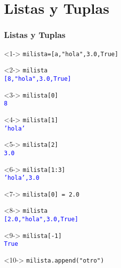 \section{Listas y Tuplas}
\begin{frame}[fragile]
\frametitle{Listas y Tuplas}
\fontsize{12}{12}\selectfont
\begin{minipage}{5.5cm}
\begin{exampleblock}{}<1->
	\verb|milista=[a,"hola",3.0,True]|
\end{exampleblock}
\begin{exampleblock}{}<2->
	\verb|milista| \\
	\pause
	\textcolor{blue}{\texttt{[8,"hola",3.0,True]}}
\end{exampleblock}
\begin{exampleblock}{}<3->
	\verb|milista[0]| \\
	\pause
	\textcolor{blue}{\texttt{8}}
\end{exampleblock}
\begin{exampleblock}{}<4->
	\verb|milista[1]| \\
	\pause
	\textcolor{blue}{\texttt{'hola'}}
\end{exampleblock}
\begin{exampleblock}{}<5->
	\verb|milista[2]| \\
	\pause
	\textcolor{blue}{\texttt{3.0}}
\end{exampleblock}
\begin{exampleblock}{}<6->
	\verb|milista[1:3]| \\
	\pause
	\textcolor{blue}{\texttt{'hola',3.0}}
\end{exampleblock}
\begin{exampleblock}{}<7->
	\verb|milista[0] = 2.0|
\end{exampleblock}
\end{minipage}
\hspace{0.5cm}
\begin{minipage}{5.5cm}
\begin{exampleblock}{}<8->
	\verb|milista| \\
	\pause
	\textcolor{blue}{\texttt{[2.0,"hola",3.0,True]}}
\end{exampleblock}
\begin{exampleblock}{}<9->
	\verb|milista[-1]| \\
	\pause
	\textcolor{blue}{\texttt{True}}
\end{exampleblock}
\begin{exampleblock}{}<10->
	\verb|milista.append("otro")| \\

\end{exampleblock}
\end{minipage}
\end{frame}
